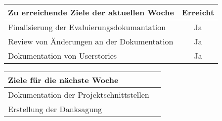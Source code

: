 \begin{tabularx}{\textwidth}{Xc}
    \arrayrulecolor{OliveGreen}
    \toprule
    {\bfseries Zu erreichende Ziele der aktuellen Woche} & {\bfseries Erreicht} \\
    \midrule[2pt]
    Finalisierung der Evaluierungsdokumantation          &Ja                    \\
    \rowcolor{OliveGreen!15}
    Review von Änderungen an der Dokumentation           &Ja                    \\
    \rowcolor{White}
    Dokumentation von Userstories                        &Ja                    \\
    \bottomrule[2pt]
\end{tabularx}
%
\vspace{1cm}
%
\begin{tabularx}{\textwidth}{Xc}
    \arrayrulecolor{OliveGreen}
    \toprule
    {\bfseries Ziele für die nächste Woche}              &                      \\
    \midrule[2pt]
    Dokumentation der Projektschnittstellen              &                      \\
    \rowcolor{OliveGreen!15}
    Erstellung der Danksagung                            &                      \\
\end{tabularx}
